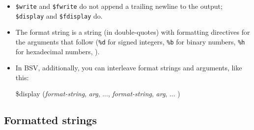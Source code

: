 \begin{frame}[fragile]
\begin{itemize}
    \vx
    \item
    {\tt \$write} and {\tt \$fwrite} do not append a trailing newline to the output;
    {\tt \$display} and {\tt \$fdisplay} do.

    \vx
    \item
    The format string is a string (in double-quotes) with formatting
    directives for the arguments that follow (\verb|%d| for signed
    integers, \verb|%b| for binary numbers, \verb|%h| for hexadecimal
    numbers, {\etc}).

    \vx
    \item In BSV, additionally, you can interleave format strings and
        arguments, like this:

    \hmmmm
    \$display  ({\it format-string}, {\it arg}, ..., {\it format-string}, {\it arg}, ... )

\end{itemize}

\end{frame}


\subsection{Formatted strings}


